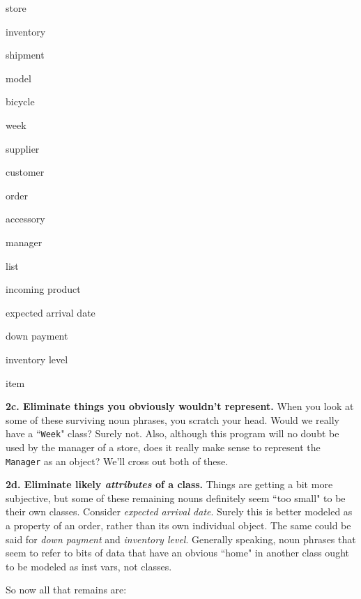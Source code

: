 \begin{multicols}{3}
\small
\begin{compactitem}
\item \textsf{store}
\item \textsf{inventory}
\item \textsf{shipment}
\item \textsf{model}
\item \textsf{bicycle}
\item \textsf{week}
\columnbreak
\item \textsf{supplier}
\item \textsf{customer}
\item \textsf{order}
\item \textsf{accessory}
\item \textsf{manager}
\columnbreak
\item \textsf{list}
\item \textsf{incoming product}
\item \textsf{expected arrival date}
\item \textsf{down payment}
\item \textsf{inventory level}
\item \textsf{item}
\end{compactitem}
\end{multicols}


\textbf{2c. Eliminate things you obviously wouldn't represent.} When you look
at some of these surviving noun phrases, you scratch your head. Would we
really have a ``\texttt{Week}" class? Surely not. Also, although this program
will no doubt be used by the manager of a store, does it really make sense to
represent the \texttt{Manager} as an object? We'll cross out both of these.

\vspace{.2in}

\textbf{2d. Eliminate likely \textit{attributes} of a class.} Things are
getting a bit more subjective, but some of these remaining nouns definitely
seem ``too small" to be their own classes. Consider \textit{expected arrival
date}. Surely this is better modeled as a property of an order, rather than
its own individual object. The same could be said for \textit{down payment}
and \textit{inventory level}. Generally speaking, noun phrases that seem to
refer to bits of data that have an obvious ``home" in another class ought to
be modeled as inst vars, not classes.

So now all that remains are:

